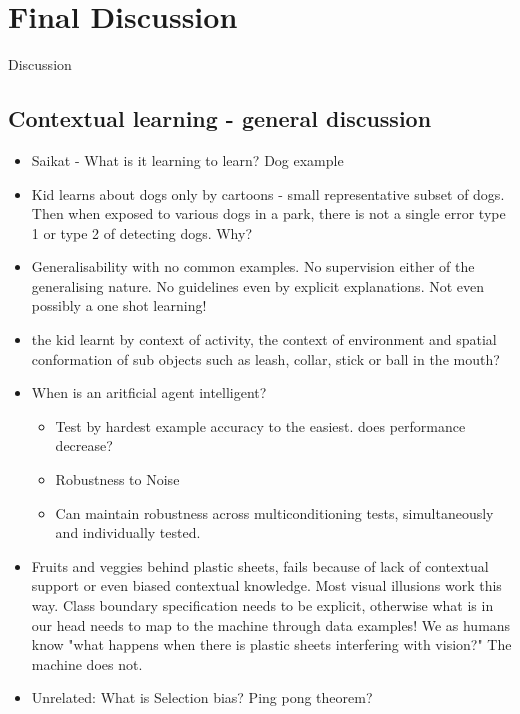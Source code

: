 
\chapter{Final Discussion}
\label{chap:discussion}
\renewcommand{\chapterheadstart}{~\vspace{1.7cm}\\}

Discussion


\section{Contextual learning - general discussion}
\begin{itemize}
\item Saikat - What is it learning to learn? Dog example
\item Kid learns about dogs only by cartoons - small representative subset of dogs. Then when exposed to various dogs in a park, there is not a single error type 1 or type 2 of detecting dogs. Why?
\item Generalisability with no common examples. No supervision either of the generalising nature. No guidelines even by explicit explanations. Not even possibly a one shot learning!
\item the kid learnt by context of activity, the context of environment and spatial conformation of sub objects such as leash, collar, stick or ball in the mouth?
\item When is an aritficial agent intelligent?
\begin{itemize}
\item Test by hardest example accuracy to the easiest. does performance decrease?
\item Robustness to Noise
\item Can maintain robustness across multiconditioning tests, simultaneously and individually tested.
\end{itemize}
\item Fruits and veggies behind plastic sheets, fails because of lack of contextual support or even biased contextual knowledge. Most visual illusions work this way. Class boundary specification needs to be explicit, otherwise what is in our head needs to map to the machine through data examples! We as humans know "what happens when there is plastic sheets interfering with vision?" The machine does not.
\item Unrelated: What is Selection bias? Ping pong theorem?
\end{itemize}
